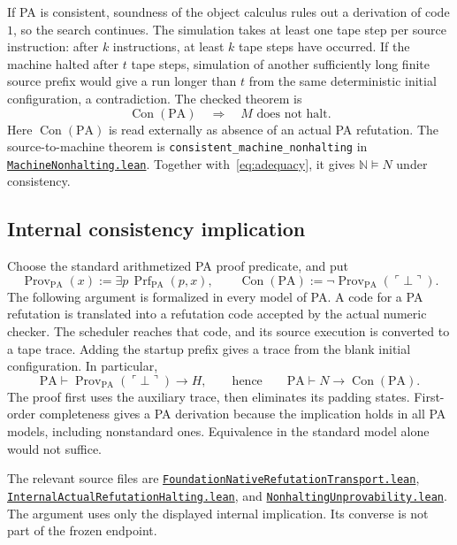 \documentclass[11pt,letterpaper]{article}
\newcommand{\PA}{\mathrm{PA}}
\newcommand{\NN}{\mathbb{N}}
\newcommand{\Con}{\operatorname{Con}}
\newcommand{\Prf}{\operatorname{Prf}}
\newcommand{\Prov}{\operatorname{Prov}}
\newcommand{\code}[1]{\ulcorner #1\urcorner}
\newcommand{\src}[2]{\href{https://github.com/jamesyc/BusyBeaver/blob/034d08df73b94e9f4036fc5af74b694eb73afc67/#1}{\texttt{\nolinkurl{#2}}}}
\newcommand{\repo}[1]{\texttt{\nolinkurl{#1}}}
\begin{document}
If PA is consistent, soundness of the object calculus rules out a
derivation of code $1$, so the search continues. The simulation takes at
least one tape step per source instruction: after $k$ instructions, at
least $k$ tape steps have occurred. If the machine halted after $t$ tape steps, simulation of
another sufficiently long finite source prefix would give a run longer
than $t$ from the same deterministic initial configuration, a
contradiction. The checked theorem is
\begin{equation}\label{eq:external}
\Con(\PA)\quad\Longrightarrow\quad M\text{ does not halt}.
\end{equation}
Here $\Con(\PA)$ is read externally as absence of an actual PA refutation.
The source-to-machine theorem is \repo{consistent_machine_nonhalting} in
\src{Lean/metamathematics/PA213PA/MachineNonhalting.lean}{MachineNonhalting.lean}.
Together with~\eqref{eq:adequacy}, it gives $\NN\models N$ under consistency.

\subsection{Internal consistency implication}

Choose the standard arithmetized PA proof predicate, and put
\[
\Prov_{\PA}(x):=\exists p\,\Prf_{\PA}(p,x),\qquad
\Con(\PA):=\neg\Prov_{\PA}(\code{\bot}).
\]
The following argument is formalized in every model of PA.
A code for a PA refutation is translated into a refutation code accepted
by the actual numeric checker. The scheduler reaches that code, and its
source execution is converted to a tape trace. Adding the startup prefix
gives a trace from the blank initial configuration. In particular,
\[
\PA\vdash \Prov_{\PA}(\code{\bot})\to H,
\qquad\text{hence}\qquad
\boxed{\PA\vdash N\to\Con(\PA).}
\]
The proof first uses the auxiliary trace, then eliminates its padding
states. First-order completeness gives a PA derivation because the
implication holds in all PA models, including nonstandard ones.
Equivalence in the standard model alone would not suffice.

The relevant source files are
\src{Lean/metamathematics/PA215PA/FoundationNativeRefutationTransport.lean}{FoundationNativeRefutationTransport.lean},
\src{Lean/metamathematics/PA213PA/InternalActualRefutationHalting.lean}{InternalActualRefutationHalting.lean},
and \src{Lean/metamathematics/PA213PA/NonhaltingUnprovability.lean}{NonhaltingUnprovability.lean}.
The argument uses only the displayed internal implication. Its converse
is not part of the frozen endpoint.
\end{document}
